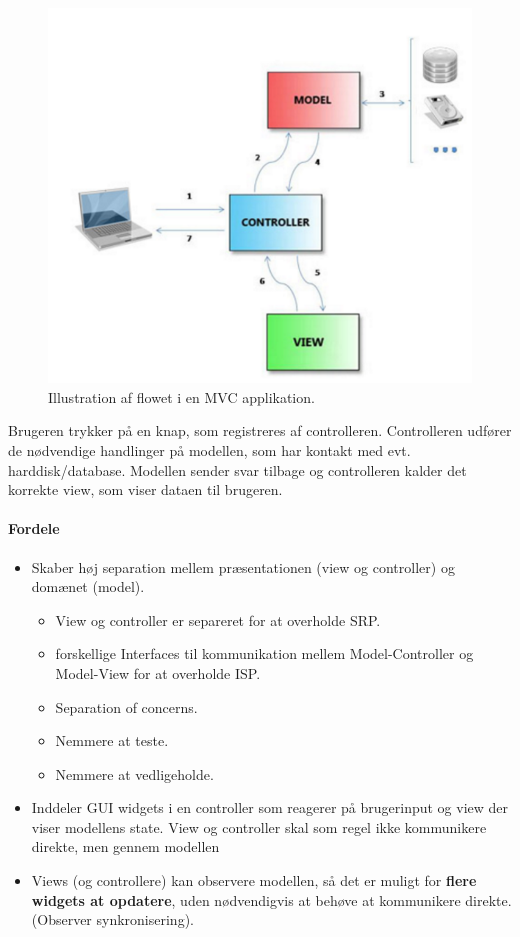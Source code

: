 \begin{figure}[h]
	\centering
	\includegraphics[width=0.6\linewidth]{figs/mvcFlow}
	\caption[Illustration af flowet i en MVC applikation]{Illustration af flowet i en MVC applikation.}
	\label{fig:mvcFlow}
\end{figure}

Brugeren trykker på en knap, som registreres af controlleren. Controlleren udfører de nødvendige handlinger på modellen, som har kontakt med evt. harddisk/database. Modellen sender svar tilbage og controlleren kalder det korrekte view, som viser dataen til brugeren.

\paragraph{Fordele}
\begin{itemize}
	\item Skaber høj separation mellem præsentationen (view og controller) og domænet (model).
	\begin{itemize}
		\item View og controller er separeret for at overholde SRP.
		\item forskellige Interfaces til kommunikation mellem Model-Controller og Model-View for at overholde ISP.
		\item Separation of concerns.
		\item Nemmere at teste.
		\item Nemmere at vedligeholde.
	\end{itemize}
	\item Inddeler GUI widgets i en controller som reagerer på brugerinput og view der viser modellens state. View og controller skal som regel ikke kommunikere direkte, men gennem modellen
	\item Views (og controllere) kan observere modellen, så det er muligt for \textbf{flere widgets at opdatere}, uden nødvendigvis at behøve at kommunikere direkte. (Observer synkronisering).
\end{itemize}

